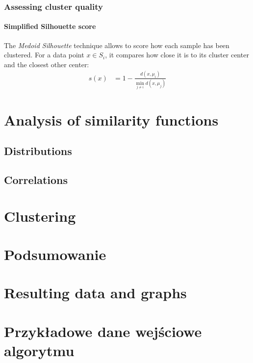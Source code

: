 \documentclass[en]{pracamgr}
\begin{document}
\subsection{Assessing cluster quality}

\subsubsection{Simplified Silhouette score}

The \textit{Medoid Silhouette} technique allows to score how each sample has
been clustered. For a data point $x \in S_i$, it compares how close it is to
its cluster center and the closest other center:
\begin{align*}
  s(x) &= 1 - \frac{d(x,\mu_i)}{\min\limits_{j \neq i}d(x,\mu_j)}
\end{align*}

\chapter{Analysis of similarity functions}

\section{Distributions}

\section{Correlations}

\chapter{Clustering}

\chapter{Podsumowanie}

\appendix

\chapter{Resulting data and graphs}

\chapter{Przykładowe dane wejściowe algorytmu}
\end{document}
